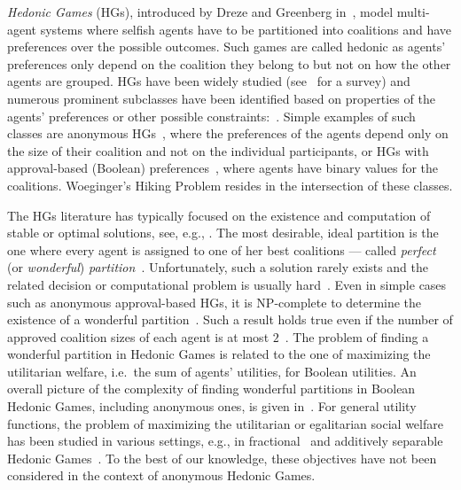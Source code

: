 \documentclass[a4paper,UKenglish,cleveref, autoref, thm-restate]{lipics-v2021}
\begin{document}
\emph{Hedonic Games} (HGs), introduced by Dreze and Greenberg in~\cite{dreze1980hedonic}, model multi-agent systems where selfish agents have to be partitioned into coalitions and have preferences over the possible outcomes. Such games are called hedonic as agents’ preferences only depend on the coalition they belong to but not on how the other agents are grouped. 
HGs have been widely studied (see~\cite{aziz2016hedonic} for a survey) and numerous prominent subclasses have been identified based on properties of the agents' preferences or other possible constraints:~\cite{ballester2004np,bogomolnaia2002stability,alcalde2004researching,olsen2009nash,Elkind09, aziz2019fractional}. 
Simple examples of such classes are anonymous HGs~\cite{banerjee2001core}, where the preferences of the agents depend only on the size of their coalition and not on the individual participants, or HGs with approval-based (Boolean) preferences~\cite{aziz2016boolean}, where agents have binary values for the coalitions. Woeginger’s Hiking Problem resides in the intersection of these classes.

The HGs literature has typically focused on the existence and computation of stable or optimal solutions, see, e.g., \cite{bogomolnaia2002stability}. The most desirable, ideal partition is the one where every agent is assigned to one of her best coalitions --- called {\em perfect} (or {\em wonderful}) {\em partition}~\cite{aziz2013pareto}. Unfortunately, such a solution rarely exists and the related decision or computational problem is usually hard~\cite{aziz2013pareto,peters2016complexity}.
Even in simple cases such as anonymous approval-based HGs, it is NP-complete to determine the existence of a wonderful partition~\cite{Darmann_journal,woeginger2013core}. 
Such a result holds true even if the number of approved coalition sizes of each agent is at most $2$~\cite{Darmann_journal}.
The problem of finding a wonderful partition in Hedonic Games is related to the one of maximizing the utilitarian welfare, i.e.\ the sum of agents' utilities, for Boolean utilities. An overall picture of the complexity of finding wonderful partitions in Boolean Hedonic Games, including anonymous ones, is given in~\cite{peters2016complexity}. For general utility functions, the problem of maximizing the utilitarian or egalitarian social welfare has been studied in various settings, e.g., in fractional~\cite{AGGMT15} and additively separable Hedonic Games~\cite{ABG16}. To the best of our knowledge, these objectives have not been considered in the context of anonymous Hedonic Games.
\end{document}
